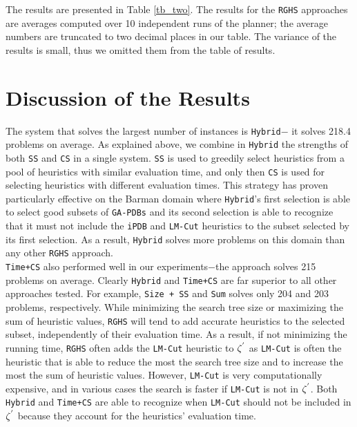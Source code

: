 The results are presented in Table \ref{tb_two}. The results for the \texttt{RGHS} approaches are averages computed over 10 independent runs of the planner; the average numbers are truncated to two decimal places in our table. The variance of the results is small, thus we omitted them from the table of results.\\

\section{Discussion of the Results}
\noindent
The system that solves the largest number of instances is \texttt{Hybrid}$-$ it solves 218.4 problems on average. As explained above, we combine in \texttt{Hybrid} the strengths of both \texttt{SS} and \texttt{CS} in a single system. \texttt{SS} is used to greedily select heuristics from a pool of heuristics with similar evaluation time, and only then \texttt{CS} is used for selecting heuristics with different evaluation times. This strategy has proven particularly effective on the Barman domain where \texttt{Hybrid}'s first selection is able to select good subsets of \texttt{GA-PDBs} and its second selection is able to recognize that it must not include the \texttt{iPDB} and \texttt{LM-Cut} heuristics to the subset selected by its first selection. As a result, \texttt{Hybrid} solves more problems on this domain than any other \texttt{RGHS} approach.\\

\texttt{Time+CS} also performed well in our experiments$-$the approach solves 215 problems on average. Clearly \texttt{Hybrid} and \texttt{Time+CS} are far superior to all other approaches tested. For example, \texttt{Size + SS} and \texttt{Sum} solves only 204 and 203 problems, respectively. While minimizing the search tree size or maximizing the sum of heuristic values, \texttt{RGHS} will tend to add accurate heuristics to the selected subset, independently of their evaluation time. As a result, if not minimizing the running time, \texttt{RGHS} often adds the \texttt{LM-Cut} heuristic to $\zeta\sp{'}$ as \texttt{LM-Cut} is often the heuristic that is able to reduce the most the search tree size and to increase the most the sum of heuristic values. However, \texttt{LM-Cut} is very computationally expensive, and in various cases the search is faster if \texttt{LM-Cut} is not in $\zeta\sp{'}$. Both \texttt{Hybrid} and \texttt{Time+CS} are able to recognize when \texttt{LM-Cut} should not be included in $\zeta\sp{'}$ because they account for the heuristics' evaluation time.\\

